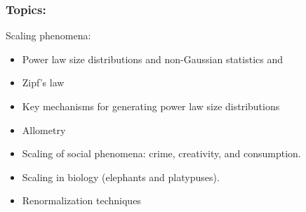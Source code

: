 \begin{frame}
  \frametitle{Topics:}
  
  \begin{block}{Scaling phenomena:}
    \begin{itemize}
    \item 
      Power law size distributions and non-Gaussian statistics and 
    \item 
      Zipf's law
    \item 
      Key mechanisms for generating power law size distributions
    \item 
      Allometry
    \item 
      Scaling of social phenomena: crime, creativity, and consumption.
    \item 
      Scaling in biology (elephants and platypuses).
    \item 
      Renormalization techniques
    \end{itemize}
  \end{block}



\end{frame}

